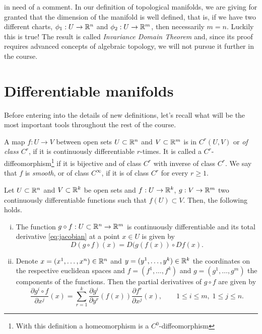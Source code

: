  in need of a comment.
In our definition of topological manifolds, we are giving for granted that the dimension of the manifold is well defined, that is, if we have two different charts, $\phi_1: U \to \mathbb{R}^n$ and $\phi_2: U \to \mathbb{R}^m$, then necessarily $m=n$. Luckily this is true! The result is called \emph{Invariance Domain Theorem} and, since its proof requires advanced concepts of algebraic topology, we will not pursue it further in the course.

\section{Differentiable manifolds}

Before entering into the details of new definitions, let's recall what will be the most important tools throughout the rest of the course.

\begin{definition}
  A map $f: U \to V$ between open sets $U\subset\mathbb{R}^n$ and $V\subset\mathbb{R}^m$ is in $C^r(U,V)$ or \emph{of class $C^r$}, if it is continuously differentiable $r$-times.
  It is called a $C^r$-diffeomorphism\footnote{With this definition a homeomorphism is a $C^0$-diffeomorphism} if it is bijective and of class $C^r$ with inverse of class $C^r$.
  We say that $f$ is \emph{smooth}, or of class $C^\infty$, if it is of class $C^r$ for every $r \geq 1$.
\end{definition}

\begin{theorem}\label{thm:chainrule}
Let $U\subset\mathbb{R}^n$ and $V\subset\mathbb{R}^k$ be open sets and $f: U \to \mathbb{R}^k$, $g: V\to\mathbb{R}^m$ two continuously differentiable functions such that $f(U)\subset V$.
Then, the following holds.
\begin{enumerate}[(i)]
  \item\label{thm:chainrule1} The function $g\circ f: U\subset\mathbb{R}^n \to\mathbb{R}^m$ is continuously differentiable and its total derivative \eqref{eq:jacobian} at a point $x\in U$ is given by
\begin{equation}
  D(g\circ f)(x) = D(g(f(x)) \circ Df(x).
\end{equation}
\item\label{thm:chainrule2} Denote $x=(x^1, \ldots, x^n)\in\mathbb{R}^n$ and $y=(y^1,\ldots,y^k)\in\mathbb{R}^k$ the coordinates on the respective euclidean spaces and $f=(f^1,\ldots,f^k)$ and $g=(g^1,\ldots,g^m)$ the components of the functions. Then the partial derivatives of $g\circ f$ are given by
\begin{equation}
  \frac{\partial g^i\circ f}{\partial x^j}(x)
  = \sum_{r=1}^k \frac{\partial g^i}{\partial y^r}(f(x)) \frac{\partial f^r}{\partial x^j}(x),
\qquad 1\leq i \leq m,\; 1\leq j\leq n.
\end{equation}
\end{enumerate}
\end{theorem}

